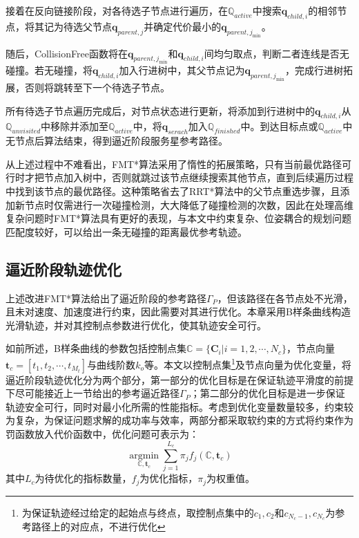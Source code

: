 \documentclass[lang=chs, degree=master, blindreview=false, winfonts=true]{yanputhesis}
\begin{document}
接着在反向链接阶段，对各待选子节点进行遍历，在$\mathbb{Q}_{active}$中搜索$\boldsymbol{q}_{child,i}$的相邻节点，将其记为待选父节点$\boldsymbol{q}_{parent,j}$并确定代价最小的$\boldsymbol{q}_{parent,j_{\min}}$。

随后，CollisionFree函数将在$\boldsymbol{q}_{parent,j_{\min}}$和$\boldsymbol{q}_{child,i}$间均匀取点，判断二者连线是否无碰撞。若无碰撞，将$\boldsymbol{q}_{child,i}$加入行进树中，其父节点记为$\boldsymbol{q}_{parent,j_{\min}}$，完成行进树拓展，否则将跳转至下一个待选子节点。

所有待选子节点遍历完成后，对节点状态进行更新，将添加到行进树中的$\boldsymbol{q}_{child,i}$从$\mathbb{Q}_{unvisited}$中移除并添加至$\mathbb{Q}_{active}$中，将$\boldsymbol{q}_{serach}$加入$\mathbb{Q}_{finished}$中。到达目标点或$\mathbb{Q}_{active}$中无节点后算法结束，得到逼近阶段服务星参考路径。

从上述过程中不难看出，FMT*算法采用了惰性的拓展策略，只有当前最优路径可行时才把节点加入树中，否则就跳过该节点继续搜索其他节点，直到后续遍历过程中找到该节点的最优路径。这种策略省去了RRT*算法中的父节点重选步骤，且添加新节点时仅需进行一次碰撞检测，大大降低了碰撞检测的次数，因此在处理高维复杂问题时FMT*算法具有更好的表现\cite{jansonFastMarchingTree2015}，与本文中约束复杂、位姿耦合的规划问题匹配度较好，可以给出一条无碰撞的距离最优参考轨迹。

\subsection{逼近阶段轨迹优化}
上述改进FMT*算法给出了逼近阶段的参考路径$\Gamma_{P}$，但该路径在各节点处不光滑，且未对速度、加速度进行约束，因此需要对其进行优化。本章采用B样条曲线构造光滑轨迹，并对其控制点参数进行优化，使其轨迹安全可行。

如前所述，B样条曲线的参数包括控制点集$\mathbb{C}=\{\boldsymbol{C}_{i}|i=1,2,\cdots,N_c\}$，节点向量$\boldsymbol{t}_{c}=[t_1,t_2,\cdots,t_{M_{t}}]$与曲线阶数$k_{o}$等。本文以控制点集\footnote{为保证轨迹经过给定的起始点与终点，取控制点集中的${c}_{1},{c}_{2}$和${c}_{N_c-1},{c}_{N_c}$为参考路径上的对应点，不进行优化}及节点向量为优化变量，将逼近阶段轨迹优化分为两个部分，第一部分的优化目标是在保证轨迹平滑度的前提下尽可能接近上一节给出的参考逼近路径$\Gamma_{P}$；第二部分的优化目标是进一步保证轨迹安全可行，同时对最小化所需的性能指标。考虑到优化变量数量较多，约束较为复杂，为保证问题求解的成功率与效率，两部分都采取软约束的方式将约束作为罚函数放入代价函数中，优化问题可表示为：
\begin{equation}
	\label{tra_cost_func}
	\mathop{\arg\min}\limits_{\mathbb{C},\boldsymbol{t}_{c}} \sum_{j=1}^{L_c} \pi_{j}f_{j}(\mathbb{C},\boldsymbol{t}_{c})
\end{equation}
其中$L_c$为待优化的指标数量，$f_{j}$为优化指标，$\pi_{j}$为权重值。
\end{document}
